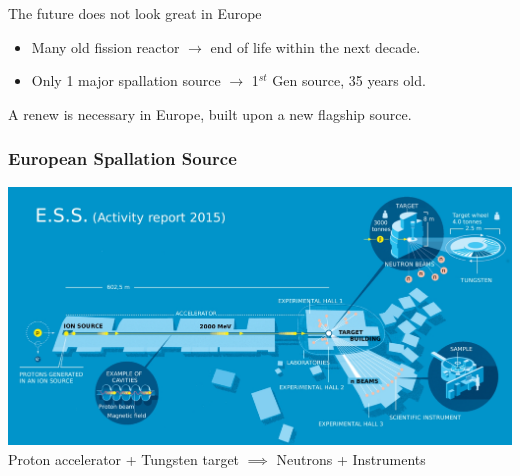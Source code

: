 \begin{frame}
\begin{columns}
\begin{column}{0.50\textwidth}
    \end{column}
  \end{columns}
  \begin{alertblock}{The future does not look great in Europe}
    \begin{itemize}
      \item Many old fission reactor $\rightarrow$ end of life within the next decade.
      \item Only 1 major spallation source $\rightarrow$ 1$^{st}$ Gen source, 35 years old.
    \end{itemize}
    A renew is necessary in Europe, built upon a new flagship source.
  \end{alertblock}
\end{frame}

\begin{frame}[t]
  \frametitle{European Spallation Source}
  \centering
  \includegraphics[width=1.\textwidth]{01_Neutron/fig/fig000_ESS_com}
  Proton accelerator + Tungsten target $\implies$ Neutrons + Instruments
\end{frame}

